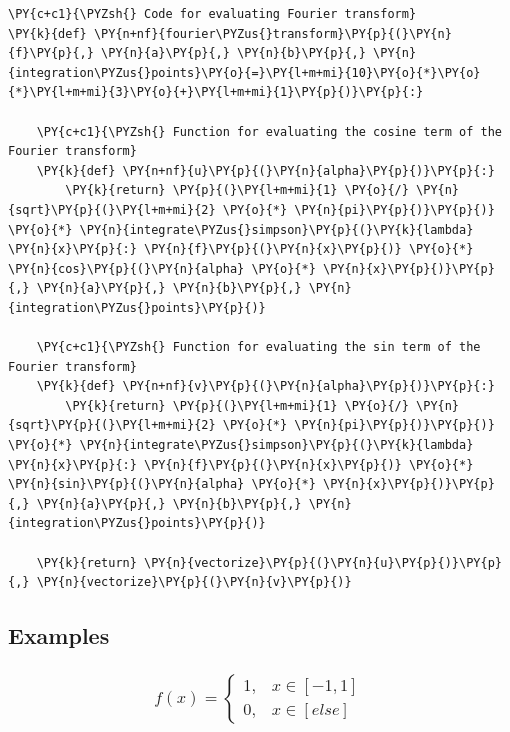     \begin{tcolorbox}[breakable, size=fbox, boxrule=1pt, pad at break*=1mm,colback=cellbackground, colframe=cellborder]
\begin{Verbatim}[commandchars=\\\{\}]
\PY{c+c1}{\PYZsh{} Code for evaluating Fourier transform}
\PY{k}{def} \PY{n+nf}{fourier\PYZus{}transform}\PY{p}{(}\PY{n}{f}\PY{p}{,} \PY{n}{a}\PY{p}{,} \PY{n}{b}\PY{p}{,} \PY{n}{integration\PYZus{}points}\PY{o}{=}\PY{l+m+mi}{10}\PY{o}{*}\PY{o}{*}\PY{l+m+mi}{3}\PY{o}{+}\PY{l+m+mi}{1}\PY{p}{)}\PY{p}{:}

    \PY{c+c1}{\PYZsh{} Function for evaluating the cosine term of the Fourier transform}
    \PY{k}{def} \PY{n+nf}{u}\PY{p}{(}\PY{n}{alpha}\PY{p}{)}\PY{p}{:}
        \PY{k}{return} \PY{p}{(}\PY{l+m+mi}{1} \PY{o}{/} \PY{n}{sqrt}\PY{p}{(}\PY{l+m+mi}{2} \PY{o}{*} \PY{n}{pi}\PY{p}{)}\PY{p}{)} \PY{o}{*} \PY{n}{integrate\PYZus{}simpson}\PY{p}{(}\PY{k}{lambda} \PY{n}{x}\PY{p}{:} \PY{n}{f}\PY{p}{(}\PY{n}{x}\PY{p}{)} \PY{o}{*} \PY{n}{cos}\PY{p}{(}\PY{n}{alpha} \PY{o}{*} \PY{n}{x}\PY{p}{)}\PY{p}{,} \PY{n}{a}\PY{p}{,} \PY{n}{b}\PY{p}{,} \PY{n}{integration\PYZus{}points}\PY{p}{)}

    \PY{c+c1}{\PYZsh{} Function for evaluating the sin term of the Fourier transform}
    \PY{k}{def} \PY{n+nf}{v}\PY{p}{(}\PY{n}{alpha}\PY{p}{)}\PY{p}{:}
        \PY{k}{return} \PY{p}{(}\PY{l+m+mi}{1} \PY{o}{/} \PY{n}{sqrt}\PY{p}{(}\PY{l+m+mi}{2} \PY{o}{*} \PY{n}{pi}\PY{p}{)}\PY{p}{)} \PY{o}{*} \PY{n}{integrate\PYZus{}simpson}\PY{p}{(}\PY{k}{lambda} \PY{n}{x}\PY{p}{:} \PY{n}{f}\PY{p}{(}\PY{n}{x}\PY{p}{)} \PY{o}{*} \PY{n}{sin}\PY{p}{(}\PY{n}{alpha} \PY{o}{*} \PY{n}{x}\PY{p}{)}\PY{p}{,} \PY{n}{a}\PY{p}{,} \PY{n}{b}\PY{p}{,} \PY{n}{integration\PYZus{}points}\PY{p}{)}

    \PY{k}{return} \PY{n}{vectorize}\PY{p}{(}\PY{n}{u}\PY{p}{)}\PY{p}{,} \PY{n}{vectorize}\PY{p}{(}\PY{n}{v}\PY{p}{)}
\end{Verbatim}
\end{tcolorbox}

    \hypertarget{examples}{%
\subsection{Examples}\label{examples}}

    \hypertarget{fx-begincases-1-x-in--1-1-0-x-in-else-endcases}{%
\subsubsection{\texorpdfstring{\[f(x) = \begin{cases} 1, & x \in [-1, 1] \\ 0, & x \in [else] \end{cases}\]}{f(x) = \textbackslash begin\{cases\} 1, \& x \textbackslash in {[}-1, 1{]} \textbackslash\textbackslash{} 0, \& x \textbackslash in {[}else{]} \textbackslash end\{cases\}}}\label{fx-begincases-1-x-in--1-1-0-x-in-else-endcases}}


